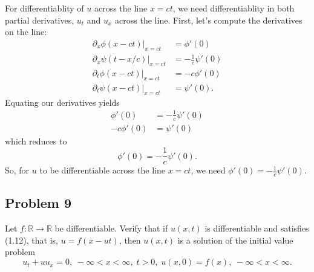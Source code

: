 \documentclass[a4paper,12pt]{article}
\newcommand{\reals}{\mathbb{R}}
\begin{document}
\begin{enumerate}[label = \textbf{(\alph*)}]
\begin{enumerate}[label = \textbf{(\roman*)}]
            For differentiablity of $ u $ across the line $ x = ct $, we need differentiablity in both partial derivatives, $ u_t $ and $ u_x $ across the line. First, let's compute the derivatives on the line:
            \begin{align*}
                \left.\partial_x \phi(x - ct)\right\lvert_{x = ct}  &= \phi'(0) \\
                \left.\partial_x \psi(t - x/c)\right\lvert_{x = ct} &= -\frac{1}{c}\psi'(0) \\
                \left.\partial_t  \phi(x - ct)\right\lvert_{x = ct}  &= -c\phi'(0) \\
                \left.\partial_t  \psi(x - ct)\right\lvert_{x = ct}  &= \psi'(0).
            \end{align*}
            Equating our derivatives yields
            \begin{align*}
                \phi'(0) &= -\frac{1}{c}\psi'(0) \\
                -c\phi'(0) &= \psi'(0)
            \end{align*}
            which reduces to
            \[
                \phi'(0) = -\frac{1}{c}\psi'(0).
            \]
            So, for $ u $ to be differentiable across the line $ x = ct $, we need $ \phi'(0) = -\frac{1}{c}\psi'(0) $.
        \end{enumerate}
    \end{enumerate}

\subsection*{Problem 9}
    Let $ f : \reals \to \reals $ be differentiable. Verify that if $ u(x, t) $ is differentiable and satisfies (1.12), that is, $ u = f(x - ut) $, then $ u(x, t) $ is a solution of the initial value problem
    \[
    	u_t + u u_x = 0, \; -\infty < x < \infty, \; t > 0, \;u(x, 0) = f(x), \; -\infty < x < \infty.
    \]
    
\end{document}
